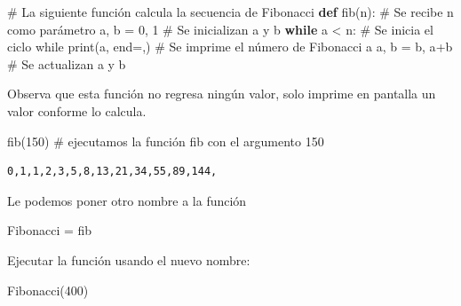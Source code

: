 \documentclass[
  spanish,
  letterpaper,
]{scrbook}
\newenvironment{Shaded}{\begin{snugshade}}{\end{snugshade}}
\newcommand{\BuiltInTok}[1]{\textcolor[rgb]{0.00,0.23,0.31}{#1}}
\newcommand{\CommentTok}[1]{\textcolor[rgb]{0.37,0.37,0.37}{#1}}
\newcommand{\ControlFlowTok}[1]{\textcolor[rgb]{0.00,0.23,0.31}{\textbf{#1}}}
\newcommand{\DecValTok}[1]{\textcolor[rgb]{0.68,0.00,0.00}{#1}}
\newcommand{\KeywordTok}[1]{\textcolor[rgb]{0.00,0.23,0.31}{\textbf{#1}}}
\newcommand{\NormalTok}[1]{\textcolor[rgb]{0.00,0.23,0.31}{#1}}
\newcommand{\OperatorTok}[1]{\textcolor[rgb]{0.37,0.37,0.37}{#1}}
\newcommand{\StringTok}[1]{\textcolor[rgb]{0.13,0.47,0.30}{#1}}
\theoremstyle{definition}
\theoremstyle{remark}
\begin{document}
\begin{Shaded}
\begin{Highlighting}[]
\CommentTok{\# La siguiente función calcula la secuencia de Fibonacci}
\KeywordTok{def}\NormalTok{ fib(n):         }\CommentTok{\# Se recibe \textquotesingle{}n\textquotesingle{} como parámetro}
\NormalTok{    a, b }\OperatorTok{=} \DecValTok{0}\NormalTok{, }\DecValTok{1}     \CommentTok{\# Se inicializan \textquotesingle{}a\textquotesingle{} y \textquotesingle{}b\textquotesingle{}}
    \ControlFlowTok{while}\NormalTok{ a }\OperatorTok{\textless{}}\NormalTok{ n:    }\CommentTok{\# Se inicia el ciclo \textquotesingle{}while\textquotesingle{}}
        \BuiltInTok{print}\NormalTok{(a, end}\OperatorTok{=}\StringTok{\textquotesingle{},\textquotesingle{}}\NormalTok{)  }\CommentTok{\# Se imprime el número de Fibonacci \textquotesingle{}a\textquotesingle{}}
\NormalTok{        a, b }\OperatorTok{=}\NormalTok{ b, a}\OperatorTok{+}\NormalTok{b      }\CommentTok{\# Se actualizan \textquotesingle{}a\textquotesingle{} y \textquotesingle{}b\textquotesingle{}}
\end{Highlighting}
\end{Shaded}

Observa que esta función no regresa ningún valor, solo imprime en
pantalla un valor conforme lo calcula.

\begin{Shaded}
\begin{Highlighting}[]
\NormalTok{fib(}\DecValTok{150}\NormalTok{) }\CommentTok{\# ejecutamos la función fib con el argumento 150}
\end{Highlighting}
\end{Shaded}

\begin{verbatim}
0,1,1,2,3,5,8,13,21,34,55,89,144,
\end{verbatim}

Le podemos poner otro nombre a la función

\begin{Shaded}
\begin{Highlighting}[]
\NormalTok{Fibonacci }\OperatorTok{=}\NormalTok{ fib}
\end{Highlighting}
\end{Shaded}

Ejecutar la función usando el nuevo nombre:

\begin{Shaded}
\begin{Highlighting}[]
\NormalTok{Fibonacci(}\DecValTok{400}\NormalTok{)}
\end{Highlighting}
\end{Shaded}
\end{document}

